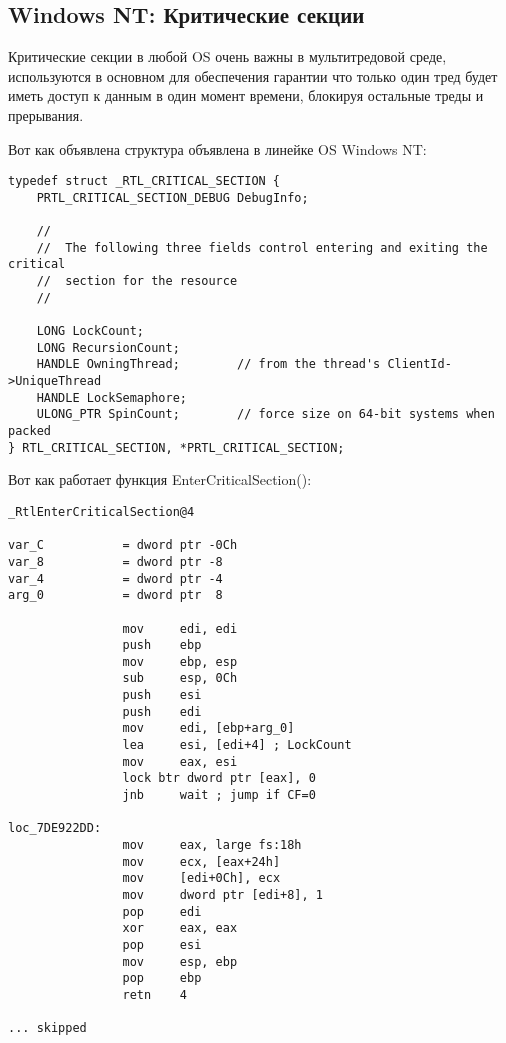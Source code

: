 \subsection{Windows NT: Критические секции}

\label{critical_sections}

Критические секции в любой \ac{OS} очень важны в мультитредовой среде, используются в основном
для обеспечения гарантии что только один тред будет иметь доступ к данным в один момент времени,
блокируя остальные треды и прерывания.


\par
Вот как объявлена структура  
объявлена в линейке OS \gls{Windows NT}:

\begin{lstlisting}[caption=(Windows Research Kernel v1.2) public/sdk/inc/nturtl.h,style=customc]
typedef struct _RTL_CRITICAL_SECTION {
    PRTL_CRITICAL_SECTION_DEBUG DebugInfo;

    //
    //  The following three fields control entering and exiting the critical
    //  section for the resource
    //

    LONG LockCount;
    LONG RecursionCount;
    HANDLE OwningThread;        // from the thread's ClientId->UniqueThread
    HANDLE LockSemaphore;
    ULONG_PTR SpinCount;        // force size on 64-bit systems when packed
} RTL_CRITICAL_SECTION, *PRTL_CRITICAL_SECTION;
\end{lstlisting}

Вот как работает функция EnterCriticalSection():

\begin{lstlisting}[caption=Windows 2008/ntdll.dll/x86 (begin),style=customasmx86]
_RtlEnterCriticalSection@4

var_C           = dword ptr -0Ch
var_8           = dword ptr -8
var_4           = dword ptr -4
arg_0           = dword ptr  8

                mov     edi, edi
                push    ebp
                mov     ebp, esp
                sub     esp, 0Ch
                push    esi
                push    edi
                mov     edi, [ebp+arg_0]
                lea     esi, [edi+4] ; LockCount
                mov     eax, esi
                lock btr dword ptr [eax], 0
                jnb     wait ; jump if CF=0

loc_7DE922DD:
                mov     eax, large fs:18h
                mov     ecx, [eax+24h]
                mov     [edi+0Ch], ecx
                mov     dword ptr [edi+8], 1
                pop     edi
                xor     eax, eax
                pop     esi
                mov     esp, ebp
                pop     ebp
                retn    4

... skipped
\end{lstlisting}

